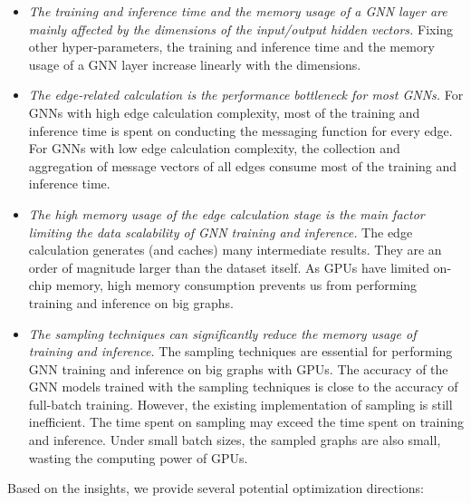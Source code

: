 \begin{itemize}
    \item \emph{The training and inference time and the memory usage of a GNN layer are mainly affected by the dimensions of the input/output hidden vectors.}
    Fixing other hyper-parameters, the training and inference time and the memory usage of a GNN layer increase linearly with the dimensions.
    
    \item \emph{The edge-related calculation is the performance bottleneck for most GNNs.}
    For GNNs with high edge calculation complexity, most of the training and inference time is spent on conducting the messaging function for every edge.
    For GNNs with low edge calculation complexity, the collection and aggregation of message vectors of all edges consume most of the training and inference time.
    
    \item \emph{The high memory usage of the edge calculation stage is the main factor limiting the data scalability of GNN training and inference.}
    The edge calculation generates (and caches) many intermediate results.
    They are an order of magnitude larger than the dataset itself.
    As GPUs have limited on-chip memory, high memory consumption prevents us from performing training and inference on big graphs.
    
    \item \emph{The sampling techniques can significantly reduce the memory usage of training and inference.}
    The sampling techniques are essential for performing GNN training and inference on big graphs with GPUs.
    The accuracy of the GNN models trained with the sampling techniques is close to the accuracy of full-batch training.
    However, the existing implementation of sampling is still inefficient.
    The time spent on sampling may exceed the time spent on training and inference.
    Under small batch sizes, the sampled graphs are also small, wasting the computing power of GPUs.
\end{itemize}

Based on the insights, we provide several potential optimization directions:

